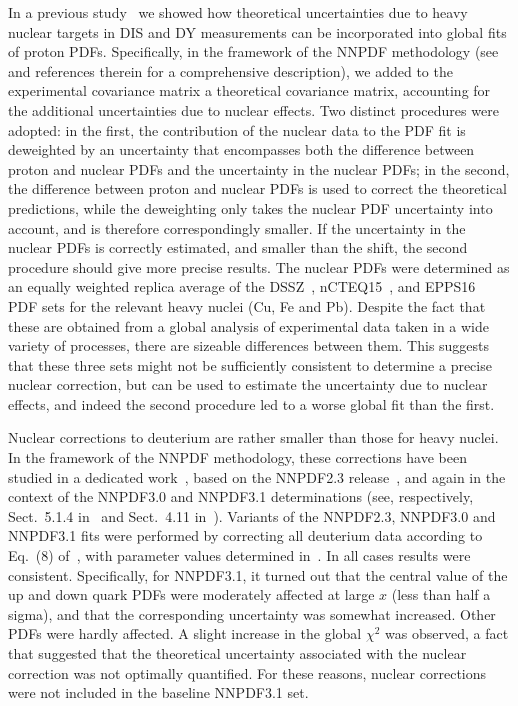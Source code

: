 \documentclass[11pt,a4paper]{article}
\begin{document}
In a previous study~\cite{Ball:2018twp} we showed how theoretical uncertainties
due to heavy nuclear targets in DIS and DY measurements can be incorporated into
global fits of proton PDFs. Specifically, in the framework of the NNPDF
methodology (see~\cite{Ball:2014uwa} and references therein for a comprehensive
description), we added to the experimental covariance matrix a theoretical
covariance matrix, accounting for the additional uncertainties due to nuclear
effects. Two distinct procedures were adopted: in the first, the contribution
of the nuclear data to the PDF fit is deweighted by an uncertainty that
encompasses both the difference between proton and nuclear PDFs and the
uncertainty in the nuclear PDFs; in the second, the difference between proton
and nuclear PDFs is used to correct the theoretical predictions, while the
deweighting only takes the nuclear PDF uncertainty into account, and is
therefore correspondingly smaller. If the uncertainty in the nuclear PDFs is
correctly estimated, and smaller than the shift, the second procedure should
give more precise results. The nuclear PDFs were determined as an equally
weighted replica average of the DSSZ~\cite{deFlorian:2011fp},
nCTEQ15~\cite{Kovarik:2015cma}, and EPPS16~\cite{Eskola:2016oht} PDF sets
for the relevant heavy nuclei (Cu, Fe and Pb).
Despite the fact that these are obtained from a global analysis of experimental
data taken in a wide variety of processes, there are sizeable differences
between them. This suggests that these three sets might not be sufficiently
consistent to determine a precise nuclear correction, but can be used to
estimate the uncertainty due to nuclear effects, and indeed the second
procedure led to a worse global fit than the first.

Nuclear corrections to deuterium are rather smaller than those for heavy nuclei.
In the framework of the NNPDF methodology, these corrections have been studied
in a dedicated work~\cite{Ball:2013gsa}, based on the NNPDF2.3
release~\cite{Ball:2012cx}, and again in the context of the NNPDF3.0 and
NNPDF3.1 determinations (see, respectively, Sect.~5.1.4 in~\cite{Ball:2014uwa}
and Sect.~4.11 in~\cite{Ball:2017nwa}). Variants of the NNPDF2.3, NNPDF3.0 and
NNPDF3.1 fits were performed by correcting all deuterium data
according to Eq.~(8) of~\cite{Harland-Lang:2014zoa}, with parameter values
determined in~\cite{Martin:2012da}. In all cases results were consistent.
Specifically, for NNPDF3.1, it turned out that the central value of the up and
down quark PDFs were moderately affected at large $x$ (less than half
a sigma), and that the corresponding uncertainty was somewhat increased.
Other PDFs were hardly affected. A slight increase in the global $\chi^2$
was observed, a fact that suggested that the theoretical uncertainty associated
with the nuclear correction was not optimally quantified. For these reasons,
nuclear corrections were not included in the baseline NNPDF3.1 set.
\end{document}
